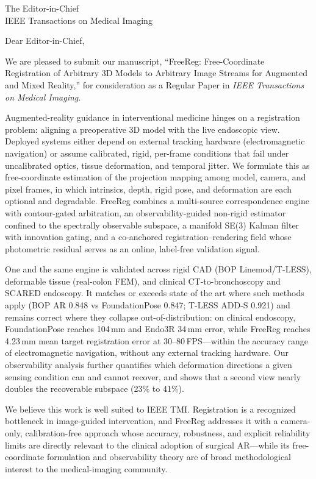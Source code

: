 \documentclass[11pt]{letter}
\begin{document}
\begin{letter}{The Editor-in-Chief\\IEEE Transactions on Medical Imaging}
\opening{Dear Editor-in-Chief,}

We are pleased to submit our manuscript, ``FreeReg: Free-Coordinate
Registration of Arbitrary 3D Models to Arbitrary Image Streams for Augmented
and Mixed Reality,'' for consideration as a Regular Paper in \emph{IEEE
Transactions on Medical Imaging}.

Augmented-reality guidance in interventional medicine hinges on a registration
problem: aligning a preoperative 3D model with the live endoscopic view.
Deployed systems either depend on external tracking hardware (electromagnetic
navigation) or assume calibrated, rigid, per-frame conditions that fail under
uncalibrated optics, tissue deformation, and temporal jitter. We formulate this
as free-coordinate estimation of the projection mapping among model, camera,
and pixel frames, in which intrinsics, depth, rigid pose, and deformation are
each optional and degradable. FreeReg combines a multi-source correspondence
engine with contour-gated arbitration, an observability-guided non-rigid
estimator confined to the spectrally observable subspace, a manifold SE(3)
Kalman filter with innovation gating, and a co-anchored registration--rendering
field whose photometric residual serves as an online, label-free validation
signal.

One and the same engine is validated across rigid CAD (BOP Linemod/T-LESS),
deformable tissue (real-colon FEM), and clinical CT-to-bronchoscopy and SCARED
endoscopy. It matches or exceeds state of the art where such methods apply (BOP
AR 0.848 vs FoundationPose 0.847; T-LESS ADD-S 0.921) and remains correct where
they collapse out-of-distribution: on clinical endoscopy, FoundationPose reaches
104\,mm and Endo3R 34\,mm error, while FreeReg reaches 4.23\,mm mean target
registration error at 30--80\,FPS---within the accuracy range of electromagnetic
navigation, without any external tracking hardware. Our observability analysis
further quantifies which deformation directions a given sensing condition can
and cannot recover, and shows that a second view nearly doubles the recoverable
subspace (23\% to 41\%).

We believe this work is well suited to IEEE TMI. Registration is a recognized
bottleneck in image-guided intervention, and FreeReg addresses it with a
camera-only, calibration-free approach whose accuracy, robustness, and explicit
reliability limits are directly relevant to the clinical adoption of surgical
AR---while its free-coordinate formulation and observability theory are of broad
methodological interest to the medical-imaging community.


\end{letter}
\end{document}
